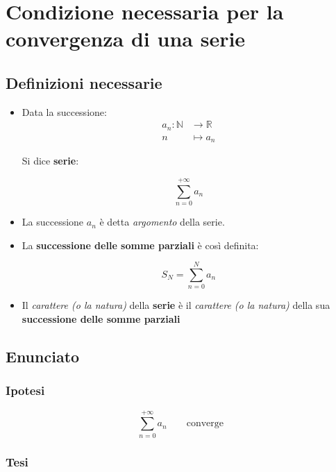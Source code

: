\documentclass[../dimostrazioni]{subfiles}
\begin{document}
    \chapter{Condizione necessaria per la convergenza di una serie}
    \label{CNconvergenza}

        \section*{Definizioni necessarie}

            \begin{itemize}
                \item Data la successione:
                        \begin{align*}
                            a_n : \mathbb{N} &\longrightarrow \mathbb{R}\\
                            n &\longmapsto a_n 
                        \end{align*}
    
                        Si dice \textbf{serie}:

                        \[  \sum_{n=0}^{+\infty} a_n\]

                \item La successione \(a_n\) è detta \textit{argomento} della serie.
                \item La \textbf{successione delle somme parziali} è così definita:
                      
                        \[  S_N = \sum_{n=0}^{N} a_n\]
                    
                \item Il  \textit{carattere (o la natura)} della \textbf{serie} è il \textit{carattere (o la natura)} della sua \textbf{successione delle somme parziali}
            \end{itemize}
           

        \section*{Enunciato}

            \subsection*{Ipotesi}

                \[  \sum_{n=0}^{+\infty} a_n \qquad \text{converge} \]
                
            \subsection*{Tesi}
\end{document}
